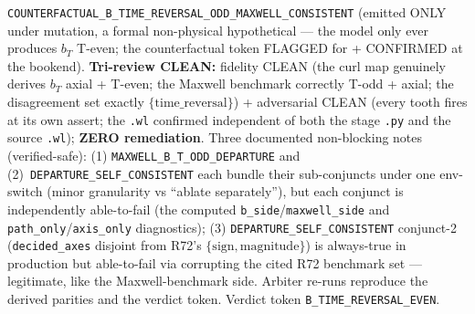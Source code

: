 \texttt{COUNTERFACTUAL\_B\_TIME\_REVERSAL\_ODD\_MAXWELL\_CONSISTENT} (emitted ONLY under
mutation, a formal non-physical hypothetical --- the model only ever produces \(b_T\)
T-even; the counterfactual token FLAGGED for + CONFIRMED at the bookend). \textbf{Tri-review
CLEAN:} fidelity CLEAN (the curl map genuinely derives \(b_T\) axial + T-even; the
Maxwell benchmark correctly T-odd + axial; the disagreement set exactly
\(\{\text{time\_reversal}\}\)) + adversarial CLEAN (every tooth fires at its own assert;
the \texttt{.wl} confirmed independent of both the stage \texttt{.py} and the source
\texttt{.wl}); \textbf{ZERO remediation}. Three documented non-blocking notes
(verified-safe): (1) \texttt{MAXWELL\_B\_T\_ODD\_DEPARTURE} and
(2)~\texttt{DEPARTURE\_SELF\_CONSISTENT} each bundle their sub-conjuncts under one
env-switch (minor granularity vs ``ablate separately''), but each conjunct is
independently able-to-fail (the computed \texttt{b\_side}/\texttt{maxwell\_side} and
\texttt{path\_only}/\texttt{axis\_only} diagnostics); (3)
\texttt{DEPARTURE\_SELF\_CONSISTENT} conjunct-2 (\texttt{decided\_axes} disjoint from
R72's \(\{\text{sign},\text{magnitude}\}\)) is always-true in production but able-to-fail
via corrupting the cited R72 benchmark set --- legitimate, like the Maxwell-benchmark
side. Arbiter re-runs reproduce the derived parities and the verdict token. Verdict
token \texttt{B\_TIME\_REVERSAL\_EVEN}.
